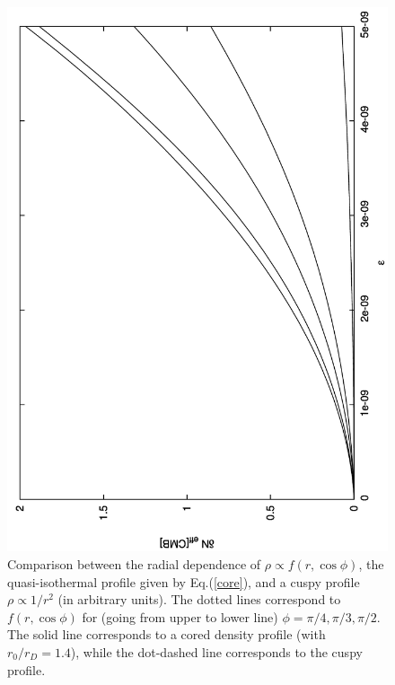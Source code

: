 \documentclass[12pt]{article}
\begin{document}
{{\begin{figure}[htpb]
    \centering
        \includegraphics[scale=0.5, angle=270]{fig8}
    \caption{Comparison between the radial dependence of $\rho \propto f(r,\cos \phi)$, the quasi-isothermal profile given by Eq.(\ref{core}), and a cuspy profile $\rho \propto 1/r ^2$ (in arbitrary units). The dotted lines correspond to $f(r,\cos \phi)$ for (going from upper to lower line) $\phi=\pi/4,\pi/3,\pi/2$. The solid line corresponds to a cored density profile (with $r _0/r _D = 1.4$), while the dot-dashed line corresponds to the cuspy profile.}
    \label{fig:Comparison core f}
\end{figure}

}}
\end{document}
